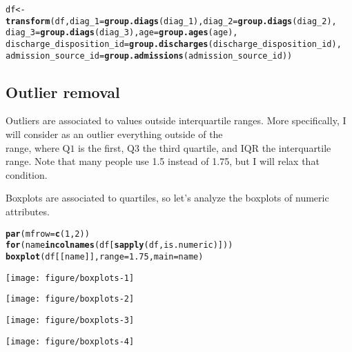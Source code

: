 \documentclass{article}\usepackage[]{graphicx}\usepackage[]{color}
\makeatletter
\def\maxwidth{ %
  \ifdim\Gin@nat@width>\linewidth
    \linewidth
  \else
    \Gin@nat@width
  \fi
}
\newcommand{\hlnum}[1]{\textcolor[rgb]{0.686,0.059,0.569}{#1}}%
\newcommand{\hlstd}[1]{\textcolor[rgb]{0.345,0.345,0.345}{#1}}%
\newcommand{\hlkwa}[1]{\textcolor[rgb]{0.161,0.373,0.58}{\textbf{#1}}}%
\newcommand{\hlkwb}[1]{\textcolor[rgb]{0.69,0.353,0.396}{#1}}%
\newcommand{\hlkwc}[1]{\textcolor[rgb]{0.333,0.667,0.333}{#1}}%
\newcommand{\hlkwd}[1]{\textcolor[rgb]{0.737,0.353,0.396}{\textbf{#1}}}%
\newenvironment{kframe}{%
 \def\at@end@of@kframe{}%
 \ifinner\ifhmode%
  \def\at@end@of@kframe{\end{minipage}}%
  \begin{minipage}{\columnwidth}%
 \fi\fi%
 \def\FrameCommand##1{\hskip\@totalleftmargin \hskip-\fboxsep
 \colorbox{shadecolor}{##1}\hskip-\fboxsep
     \hskip-\linewidth \hskip-\@totalleftmargin \hskip\columnwidth}%
 \MakeFramed {\advance\hsize-\width
   \@totalleftmargin\z@ \linewidth\hsize
   \@setminipage}}%
 {\par\unskip\endMakeFramed%
 \at@end@of@kframe}
\newenvironment{knitrout}{}{} %
\makeatother
\begin{document}
\begin{knitrout}
\begin{kframe}
\begin{alltt}
\hlstd{df} \hlkwb{<-} \hlkwd{transform}\hlstd{(df,} \hlkwc{diag_1}\hlstd{=}\hlkwd{group.diags}\hlstd{(diag_1),} \hlkwc{diag_2}\hlstd{=}\hlkwd{group.diags}\hlstd{(diag_2),}
                \hlkwc{diag_3}\hlstd{=}\hlkwd{group.diags}\hlstd{(diag_3),} \hlkwc{age}\hlstd{=}\hlkwd{group.ages}\hlstd{(age),}
                \hlkwc{discharge_disposition_id}\hlstd{=}\hlkwd{group.discharges}\hlstd{(discharge_disposition_id),}
                \hlkwc{admission_source_id}\hlstd{=}\hlkwd{group.admissions}\hlstd{(admission_source_id))}
\end{alltt}
\end{kframe}
\end{knitrout}

\subsection{Outlier removal}

Outliers are associated to values outside interquartile ranges.  More
specifically, I will consider as an outlier everything outside of the
\begin{equation}
  [\mathrm{Q1} - 1.75 \cdot \mathrm{IQR}, \mathrm{Q3} + 1.75 \cdot \mathrm{IQR}]
\end{equation}
range, where $\mathrm{Q1}$ is the first, $\mathrm{Q3}$ the third quartile, and
$\mathrm{IQR}$ the interquartile range.  Note that many people use \num{1.5}
instead of \num{1.75}, but I will relax that condition.

Boxplots are associated to quartiles, so let's analyze the boxplots of numeric attributes.

\begin{knitrout}
\color{fgcolor}\begin{kframe}
\begin{alltt}
\hlkwd{par}\hlstd{(}\hlkwc{mfrow}\hlstd{=}\hlkwd{c}\hlstd{(}\hlnum{1}\hlstd{,} \hlnum{2}\hlstd{))}
\hlkwa{for} \hlstd{(name} \hlkwa{in} \hlkwd{colnames}\hlstd{(df[}\hlkwd{sapply}\hlstd{(df, is.numeric)]))}
    \hlkwd{boxplot}\hlstd{(df[[name]],} \hlkwc{range}\hlstd{=}\hlnum{1.75}\hlstd{,} \hlkwc{main}\hlstd{=name)}
\end{alltt}
\end{kframe}

{\centering \texttt{[image: figure/boxplots-1]} 

}




{\centering \texttt{[image: figure/boxplots-2]} 

}




{\centering \texttt{[image: figure/boxplots-3]} 

}




{\centering \texttt{[image: figure/boxplots-4]} 

}



\end{knitrout}
\end{document}
